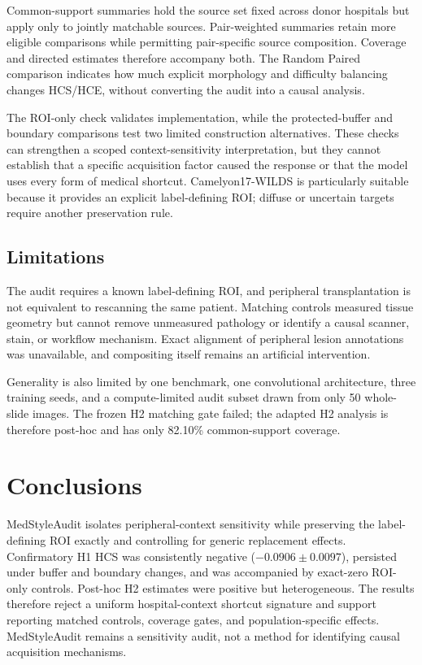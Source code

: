\documentclass[notspecified,article,submit,moreauthors]{Definitions/mdpi}
\begin{document}
Common-support summaries hold the source set fixed across donor hospitals
but apply only to jointly matchable sources. Pair-weighted summaries retain
more eligible comparisons while permitting pair-specific source composition.
Coverage and directed estimates therefore accompany both. The Random Paired
comparison indicates how much explicit morphology and difficulty balancing
changes HCS/HCE, without converting the audit into a causal analysis.

The ROI-only check validates implementation, while the protected-buffer and
boundary comparisons test two limited construction alternatives. These
checks can strengthen a scoped context-sensitivity interpretation, but they
cannot establish that a specific acquisition factor caused the response or
that the model uses every form of medical shortcut. Camelyon17-WILDS is
particularly suitable because it provides an explicit label-defining ROI;
diffuse or uncertain targets require another preservation rule.

\subsection{Limitations}

The audit requires a known label-defining ROI, and peripheral transplantation
is not equivalent to rescanning the same patient. Matching controls measured
tissue geometry but cannot remove unmeasured pathology or identify a causal
scanner, stain, or workflow mechanism. Exact alignment of peripheral lesion
annotations was unavailable, and compositing itself remains an artificial
intervention.

Generality is also limited by one benchmark, one convolutional architecture,
three training seeds, and a compute-limited audit subset drawn from only 50
whole-slide images. The frozen H2 matching gate failed; the adapted H2 analysis
is therefore post-hoc and has only 82.10\% common-support coverage.

\section{Conclusions}

MedStyleAudit isolates peripheral-context sensitivity while preserving the
label-defining ROI exactly and controlling for generic replacement effects.
Confirmatory H1 HCS was consistently negative
($-0.0906\pm0.0097$), persisted under buffer and boundary changes, and was
accompanied by exact-zero ROI-only controls. Post-hoc H2 estimates were positive
but heterogeneous. The results therefore reject a uniform hospital-context
shortcut signature and support reporting matched controls, coverage gates,
and population-specific effects. MedStyleAudit remains a sensitivity audit,
not a method for identifying causal acquisition mechanisms.
\end{document}
